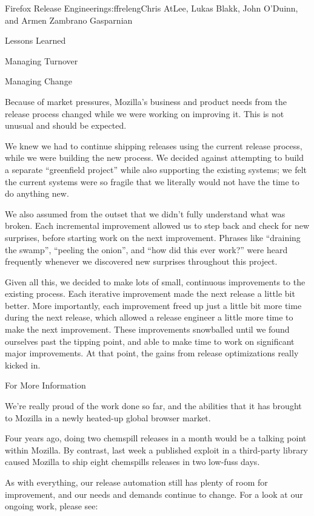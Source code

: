 \begin{aosachapter}{Firefox Release Engineering}{s:ffreleng}{Chris AtLee, Lukas Blakk, John O'Duinn, and Armen Zambrano Gasparnian}
\begin{aosasect1}{Lessons Learned}
\begin{aosasect2}{Managing Turnover}
\end{aosasect2}

\begin{aosasect2}{Managing Change}

Because of market pressures, Mozilla's business and product needs from the release process changed
while we were working on improving it. This is not unusual and should be
expected.

We knew we had to continue shipping releases using the current release process,
while we were building the new process. We decided against attempting to build
a separate ``greenfield project'' while also supporting the existing
systems; we felt the current systems were so fragile that we literally would
not have the time to do anything new.

We also assumed from the outset that we didn't fully understand what was broken. Each
incremental improvement allowed us to step back and check for new surprises,
before starting work on the next improvement. Phrases like ``draining the
swamp'', ``peeling the onion'', and ``how did this ever work?'' were heard
frequently whenever we discovered new surprises throughout this project.

Given all this, we decided to make lots of small, continuous improvements to
the existing process. Each iterative improvement made the next release a little
bit better. More importantly, each improvement freed up just a little bit more
time during the next release, which allowed a release engineer a little more
time to make the next improvement. These improvements snowballed until
we found ourselves past the tipping point, and able to make time to work on
significant major improvements. At that point, the gains from release
optimizations really kicked in.

\end{aosasect2}
\end{aosasect1}

\begin{aosasect1}{For More Information}

We're really proud of the work done so far, and the abilities that it has
brought to Mozilla in a newly heated-up global browser market.

Four years ago, doing two chemspill releases in a month would be a talking
point within Mozilla. By contrast, last week a published exploit in a third-party
library caused Mozilla to ship eight chemspills releases in two low-fuss days.

As with everything, our release automation still has plenty of room for
improvement, and our needs and demands continue to change. For a look at our
ongoing work, please see:


\end{aosasect1}
\end{aosachapter}
